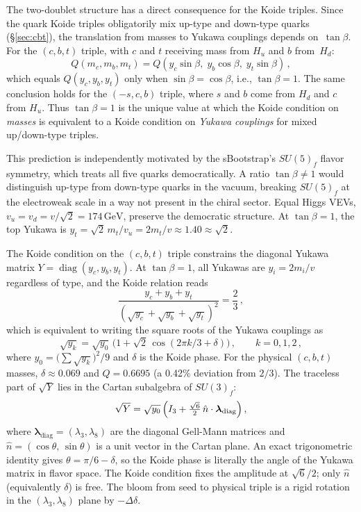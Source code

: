 \documentclass[12pt,a4paper]{article}
\newcommand{\GeV}{\,\text{GeV}}
\begin{document}
The two-doublet structure has a direct consequence for the Koide
triples. Since the quark Koide triples obligatorily mix up-type
and down-type quarks (\S\ref{sec:cbt}), the translation from
masses to Yukawa couplings depends on~$\tan\beta$.
For the $(c,b,t)$ triple, with $c$ and $t$ receiving mass
from $H_u$ and $b$ from~$H_d$:
%
\begin{equation*}
  Q(m_c, m_b, m_t)
  = Q(y_c\sin\beta,\; y_b\cos\beta,\; y_t\sin\beta)\,,
\end{equation*}
%
which equals $Q(y_c, y_b, y_t)$ only when $\sin\beta = \cos\beta$,
i.e., $\tan\beta = 1$. The same conclusion holds for the $(-s,c,b)$
triple, where $s$ and $b$ come from $H_d$ and $c$ from $H_u$.
Thus $\tan\beta = 1$ is the unique value at which the Koide condition
on \emph{masses} is equivalent to a Koide condition on
\emph{Yukawa couplings} for mixed up/down-type triples.

This prediction is independently motivated by the sBootstrap's
$SU(5)_f$ flavor symmetry, which treats all five quarks
democratically.  A ratio $\tan\beta \neq 1$ would distinguish
up-type from down-type quarks in the vacuum, breaking $SU(5)_f$
at the electroweak scale in a way not present in the chiral sector.
Equal Higgs VEVs, $v_u = v_d = v/\sqrt{2} = 174\GeV$,
preserve the democratic structure.
At $\tan\beta = 1$, the top Yukawa is
$y_t = \sqrt{2}\,m_t/v_u = 2m_t/v \approx 1.40 \approx \sqrt{2}$.

The Koide condition on the $(c,b,t)$ triple constrains the diagonal
Yukawa matrix $Y = \operatorname{diag}(y_c,y_b,y_t)$.
At $\tan\beta = 1$, all Yukawas are
$y_i = 2m_i/v$ regardless of type, and the Koide relation reads
%
\begin{equation*}
  \frac{y_c + y_b + y_t}
       {(\sqrt{y_c}+\sqrt{y_b}+\sqrt{y_t})^2}
  = \frac{2}{3}\,,
\end{equation*}
%
which is equivalent to writing the square roots of the Yukawa
couplings as
%
\begin{equation*}
  \sqrt{y_k} = \sqrt{y_0}\,
  \bigl(1 + \sqrt{2}\,\cos(2\pi k/3 + \delta)\bigr)\,,
  \qquad k = 0,1,2\,,
\end{equation*}
%
where $y_0 = \bigl(\sum\sqrt{y_k}\bigr)^2\!/9$ and $\delta$ is
the Koide phase. For the physical $(c,b,t)$ masses,
$\delta \approx 0.069$ and $Q = 0.6695$ (a 0.42\% deviation from
$2/3$). The traceless part of $\sqrt{Y}$ lies in the Cartan
subalgebra of $SU(3)_f$:
%
\begin{equation*}
  \sqrt{Y} = \sqrt{y_0}\,
  \Bigl(I_3 + \tfrac{\sqrt{6}}{2}\,
  \hat n\cdot\boldsymbol\lambda_{\text{diag}}\Bigr)\,,
\end{equation*}
%
where $\boldsymbol\lambda_{\text{diag}} = (\lambda_3, \lambda_8)$
are the diagonal Gell-Mann matrices and
$\hat n = (\cos\theta,\,\sin\theta)$ is a unit vector
in the Cartan plane.  An exact trigonometric identity gives
$\theta = \pi/6 - \delta$, so the Koide phase is literally
the angle of the Yukawa matrix in flavor space.
The Koide condition fixes the amplitude at $\sqrt{6}/2$; only
$\hat n$ (equivalently $\delta$) is free.
The bloom from seed to physical triple is a rigid rotation in
the $(\lambda_3,\lambda_8)$ plane by $-\Delta\delta$.
\end{document}
